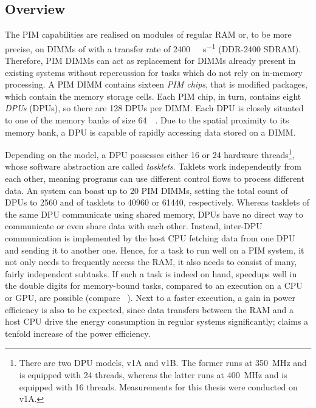 \subsection{Overview}
\label{sec:prereq:arch:overview}

\makeatletter{}\makeatother

The \ac{PIM} capabilities are realised on modules of regular \ac{RAM} or, to be more precise, on \acp{DIMM} of   with a transfer rate of \qty{2400}{\mega\transfer\per\second} (\acs{DDR}-2400 \acs{SDRAM}).
Therefore, \ac{PIM} \acp{DIMM} can act as replacement for \acp{DIMM} already present in existing systems without repercussion for tasks which do not rely on in-memory processing.
A \ac{PIM} \ac{DIMM} contains sixteen \emph{PIM chips}, that is modified  packages, which contain the memory storage cells.
Each \ac{PIM} chip, in turn, contains eight \emph{\aclp{DPU}} (\acsp{DPU}), so there are 128 \acp{DPU} per \ac{DIMM}.
Each \ac{DPU} is closely situated to one of the memory banks of size \qty{64}{\mebi\byte}.
Due to the spatial proximity to its memory bank, a \ac{DPU} is capable of rapidly accessing data stored on a \ac{DIMM}.

Depending on the model, a \ac{DPU} possesses either 16 or 24 hardware threads\footnote{
	There are two \ac{DPU} models, v1A and v1B.
	The former runs at \qty{350}{\mega\hertz} and is equipped with 24 threads, whereas the latter runs at \qty{400}{\mega\hertz} and is equipped with 16 threads.
	Measurements for this thesis were conducted on v1A.
}, whose software abstraction are called \emph{tasklets}.
Taklets work independently from each other, meaning programs can use different control flows to process different data.
An \upmem{} system can boast up to 20 \ac{PIM} \acp{DIMM}, setting the total count of \acp{DPU} to \num{2560} and of tasklets to \num{40960} or \num{61440}, respectively.
Whereas tasklets of the same \ac{DPU} communicate using shared memory, \acp{DPU} have no direct way to communicate or even share data with each other.
Instead, inter-\ac{DPU} communication is implemented by the host \ac{CPU} fetching data from one \ac{DPU} and sending it to another one.
Hence, for a task to run well on a \ac{PIM} system, it not only needs to frequently access the \ac{RAM}, it also needs to consist of many, fairly independent subtasks.
If such a task is indeed on hand, speedups well in the double digits for memory-bound tasks, compared to an execution on a \ac{CPU} or \ac{GPU}, are possible (compare \citeauthor{mutlu2022Benchmarking}~\cite{mutlu2022Benchmarking}).
Next to a faster execution, a gain in power efficiency is also to be expected, since data transfers between the \ac{RAM} and a host \ac{CPU} drive the energy consumption in regular systems significantly;
\upmem{} claims a tenfold increase of the power efficiency.

